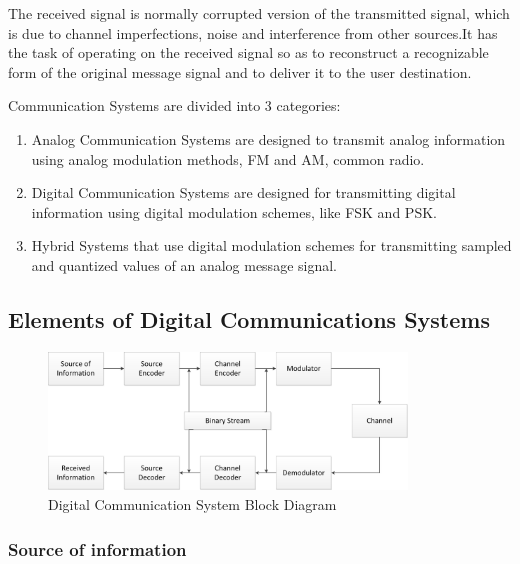 The received signal is normally corrupted version of the transmitted signal,
which is due to channel imperfections, noise and interference from other
sources.It has the task of operating on the received signal so as to reconstruct
a recognizable form of the original message signal and to deliver it to the user
destination.

Communication Systems are divided into 3 categories:

\begin{enumerate}

  \item Analog Communication Systems are designed to transmit analog information
  using analog modulation methods, FM and AM, common radio.

  \item Digital Communication Systems are designed for transmitting digital
  information using digital modulation schemes, like FSK and PSK.

  \item Hybrid Systems that use digital modulation schemes for transmitting
  sampled and quantized values of an analog message signal.

\end{enumerate}

\subsection{Elements of Digital Communications Systems}

\begin{figure}[htbp]
    \centering
    \includegraphics[width=0.85\textwidth]{./figures/digicom_bd}
    \caption{ Digital Communication System Block Diagram
    \label{fig:digcombd}}
\end{figure}

\subsubsection{Source of information}

